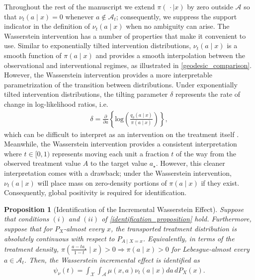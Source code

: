 \documentclass[11pt,twoside]{article}
\newtheorem{proposition}{Proposition}
\theoremstyle{definition}
\theoremstyle{remark}
\begin{document}
Throughout the rest of the manuscript we extend $\pi(\, \cdot\mid x)$ by zero outside $\mathcal{A}$ so that $\nu_t(a \mid x) = 0$ whenever $a\notin\mathcal{A}_{t}$; consequently, we suppress the support indicator in the definition of $\nu_t(a \mid x)$ when no ambiguity can arise. The Wasserstein intervention has a number of properties that make it convenient to use. Similar to exponentially tilted intervention distributions, $\nu_t(a \! \mid \! x)$ is a smooth function of $\pi(a \! \mid \! x)$ and provides a smooth interpolation between the observational and interventional regimes, as illustrated in \cref{geodesic_comparison}. However, the Wasserstein intervention provides a more interpretable parametrization of the transition between distributions.  Under exponentially tilted intervention distributions, the tilting parameter $\delta$ represents the rate of change in log-likelihood ratios, i.e.
\begin{align*}
    \delta = \frac{\partial}{\partial a} \left\{ \text{log}\left(\frac{q_\delta(a \! \mid \! x)}{\pi(a \! \mid \! x)} \right) \right\},
\end{align*}
which can be difficult to interpret as an intervention on the treatment itself \citep{schindl2024incremental}. Meanwhile, the Wasserstein intervention provides a consistent interpretation where $t \in [0, 1)$ represents moving each unit a fraction $t$ of the way from the observed treatment value $A$ to the target value $a_{\star}$. However, this cleaner interpretation comes with a drawback; under the Wasserstein intervention, $\nu_t(a \! \mid \! x)$ will place mass on zero-density portions of $\pi(a \! \mid \! x)$ if they exist. Consequently, global positivity is required for identification.
\begin{proposition}[Identification of the Incremental Wasserstein Effect] \label{identification_wass_effect} Suppose that conditions $(i)$ and $(ii)$ of \cref{identification_proposition} hold. Furthermore, suppose that for $P_X$-almost every $x$, the transported treatment distribution is absolutely continuous with respect to $P_{A\mid X=x}$. Equivalently, in terms of the treatment density, $\pi( \frac{a - ta_\star}{1 - t} \mid x )>0 \Longrightarrow \pi(a\mid x)>0$ for Lebesgue-almost every $a\in\mathcal{A}_t$. Then, the Wasserstein incremental effect is identified as
\begin{align} \label{continuous_wass_effect}
    \psi_\nu(t) = \int_{\mathcal{X}} \int_{\mathcal{A}} \mu(x, a) \nu_t(a \! \mid \! x)  da \, dP_X(x).
\end{align}
\end{proposition}
\end{document}
